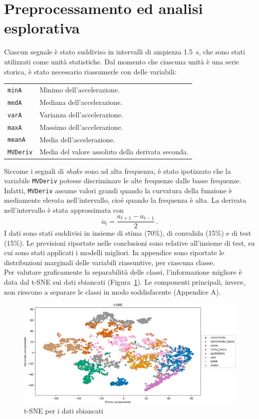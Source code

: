 \documentclass[./main.tex]{subfiles}
\begin{document}
\section{Preprocessamento ed analisi esplorativa}
Ciascun segnale è stato suddiviso in intervalli di ampiezza \SI{1.5}{s}, che sono stati utilizzati come unità statistiche. Dal momento che ciascuna unità è una serie storica, è stato necessario riassumerle con delle variabili:
\begin{table}[H]
	\centering
	\begin{tabular}{ll}
		\texttt{minA}& Minimo dell'accelerazione.\\
		\texttt{medA}& Mediana dell'accelerazione.\\
		\texttt{varA}& Varianza dell'accelerazione.\\
		\texttt{maxA}& Massimo dell'accelerazione.\\
		\texttt{meanA}& Media dell'accelerazione.\\
		\texttt{MVDeriv}& Media del valore assoluto della derivata seconda.
	\end{tabular}
\end{table}
Siccome i segnali di {\em shake} sono ad alta frequenza, è stato ipotizzato che la variabile \texttt{MVDeriv} potesse discriminare le alte frequenze dalle basse frequenze. Infatti, \texttt{MVDeriv} assume valori grandi quando la curvatura della funzione è mediamente elevata nell'intervallo, cioé quando la frequenza è alta. La derivata nell'intervallo è stata approssimata con \cite{NumpyGradientNumPy}
\[
\dot{a}_t = \dfrac{a_{t + 1} - a_{t - 1}}{2}\,.
\]
I dati sono stati suddivisi in insieme di stima (70\%), di convalida (15\%) e di test (15\%). Le previsioni riportate nelle conclusioni sono relative all'insieme di test, su cui sono stati applicati i modelli migliori.
In appendice sono riportate le distribuzioni marginali delle variabili riassuntive, per ciascuna classe.\\

Per valutare graficamente la separabilità delle classi, l'informazione migliore è data dal t-SNE sui dati sbiancati (Figura~\ref{fig:tsne}). Le componenti principali, invece, non riescono a separare le classi in modo soddisfacente (Appendice A).
\begin{figure}[H]
	\centering
	\includegraphics[width=.8\textwidth]{../../figure/t-SNE.png}
	\caption{{ t-SNE per i dati sbiancati}}
	\label{fig:tsne}
\end{figure}
\end{document}

